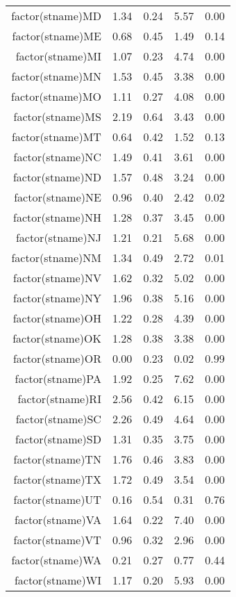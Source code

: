 \begin{table}[ht]
\begin{tabular}{rrrrr}
  factor(stname)MD & 1.34 & 0.24 & 5.57 & 0.00 \\ 
  factor(stname)ME & 0.68 & 0.45 & 1.49 & 0.14 \\ 
  factor(stname)MI & 1.07 & 0.23 & 4.74 & 0.00 \\ 
  factor(stname)MN & 1.53 & 0.45 & 3.38 & 0.00 \\ 
  factor(stname)MO & 1.11 & 0.27 & 4.08 & 0.00 \\ 
  factor(stname)MS & 2.19 & 0.64 & 3.43 & 0.00 \\ 
  factor(stname)MT & 0.64 & 0.42 & 1.52 & 0.13 \\ 
  factor(stname)NC & 1.49 & 0.41 & 3.61 & 0.00 \\ 
  factor(stname)ND & 1.57 & 0.48 & 3.24 & 0.00 \\ 
  factor(stname)NE & 0.96 & 0.40 & 2.42 & 0.02 \\ 
  factor(stname)NH & 1.28 & 0.37 & 3.45 & 0.00 \\ 
  factor(stname)NJ & 1.21 & 0.21 & 5.68 & 0.00 \\ 
  factor(stname)NM & 1.34 & 0.49 & 2.72 & 0.01 \\ 
  factor(stname)NV & 1.62 & 0.32 & 5.02 & 0.00 \\ 
  factor(stname)NY & 1.96 & 0.38 & 5.16 & 0.00 \\ 
  factor(stname)OH & 1.22 & 0.28 & 4.39 & 0.00 \\ 
  factor(stname)OK & 1.28 & 0.38 & 3.38 & 0.00 \\ 
  factor(stname)OR & 0.00 & 0.23 & 0.02 & 0.99 \\ 
  factor(stname)PA & 1.92 & 0.25 & 7.62 & 0.00 \\ 
  factor(stname)RI & 2.56 & 0.42 & 6.15 & 0.00 \\ 
  factor(stname)SC & 2.26 & 0.49 & 4.64 & 0.00 \\ 
  factor(stname)SD & 1.31 & 0.35 & 3.75 & 0.00 \\ 
  factor(stname)TN & 1.76 & 0.46 & 3.83 & 0.00 \\ 
  factor(stname)TX & 1.72 & 0.49 & 3.54 & 0.00 \\ 
  factor(stname)UT & 0.16 & 0.54 & 0.31 & 0.76 \\ 
  factor(stname)VA & 1.64 & 0.22 & 7.40 & 0.00 \\ 
  factor(stname)VT & 0.96 & 0.32 & 2.96 & 0.00 \\ 
  factor(stname)WA & 0.21 & 0.27 & 0.77 & 0.44 \\ 
  factor(stname)WI & 1.17 & 0.20 & 5.93 & 0.00 \\ 

\end{tabular}
\end{table}
